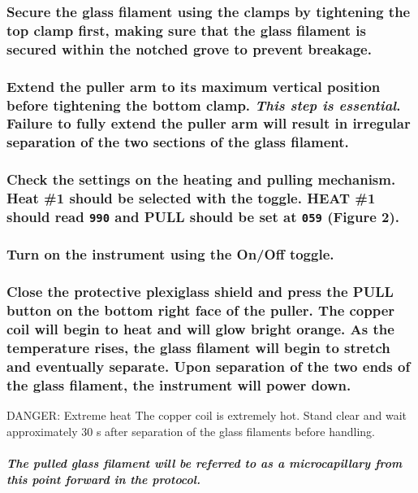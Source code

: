 \documentclass[11pt]{article}
\newcommand\dangersign[1][4ex]{\renewcommand\stacktype{L}\scaleto{\stackon[1pt]{\color{red}$\triangle$}{\tiny !}}{#1}}
\begin{document}
\subsubsection{{\sffamily } Secure the glass filament using the clamps by tightening the top clamp first, making sure that the glass filament is secured within the notched grove to prevent breakage.}
\label{sec:orgheadline24}
\subsubsection{{\sffamily } Extend the puller arm to its maximum vertical position before tightening the bottom clamp. \textbf{\emph{This step is essential}}. Failure to fully extend the puller arm will result in irregular separation of the two sections of the glass filament.}
\label{sec:orgheadline25}
\subsubsection{{\sffamily } Check the settings on the heating and pulling mechanism. Heat \#1 should be selected with the toggle. HEAT \#1 should read \texttt{990} and PULL should be set at \texttt{059} (\textbf{Figure 2}).}
\label{sec:orgheadline26}
\subsubsection{{\sffamily } Turn on the instrument using the On/Off toggle.}
\label{sec:orgheadline27}
\subsubsection{{\sffamily } Close the protective plexiglass shield and press the PULL button on the bottom right face of the puller. The copper coil will begin to heat and will glow bright orange. As the temperature rises, the glass filament will begin to stretch and eventually separate. Upon separation of the two ends of the glass filament, the instrument will power down. \\}
\label{sec:orgheadline29}
\begin{bclogo}[logo=\dangersign, couleurBarre=red, noborder=true, couleur=yellow!20]{     DANGER: Extreme heat}
The copper coil is extremely hot. Stand clear and wait approximately 30 s after separation of the glass filaments before handling.\\
\end{bclogo}
\paragraph{{\sffamily } \emph{The pulled glass filament will be referred to as a \textbf{microcapillary} from this point forward in the protocol.}}
\label{sec:orgheadline28}
\end{document}
